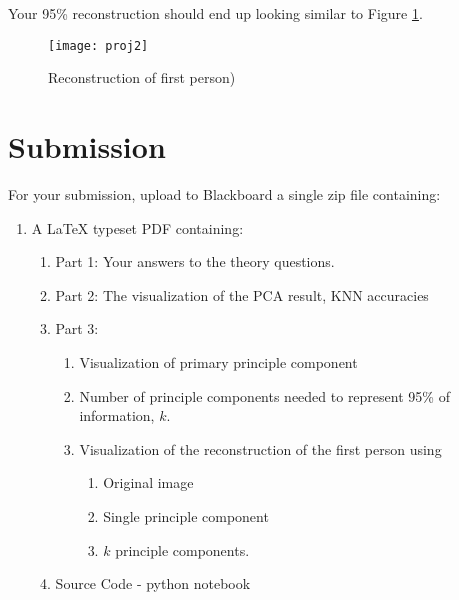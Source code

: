 \documentclass[12pt]{article}
\begin{document}
Your 95\% reconstruction should end up looking similar to Figure \ref{recon3}.
\begin{figure}[H]
\begin{center}
\texttt{[image: proj2]}
\caption{Reconstruction of first person)}
\label{recon3}
\end{center}
\end{figure}


%


\newpage
\section*{Submission}
For your submission, upload to Blackboard a single zip file containing:

\begin{enumerate}
\item A LaTeX typeset PDF containing:
\begin{enumerate}
\item Part 1: Your answers to the theory questions.
\item Part 2: The visualization of the PCA result, KNN accuracies
\item Part 3:
	\begin{enumerate}
	\item Visualization of primary principle component
		\item Number of principle components needed to represent 95\% of information, $k$.
	\item Visualization of the reconstruction of the first person using 
		\begin{enumerate}
		\item Original image
		\item Single principle component
		\item $k$ principle components.
		\end{enumerate}
	\end{enumerate}

\item Source Code - python notebook 
\end{enumerate}
\end{enumerate}
\end{document}
